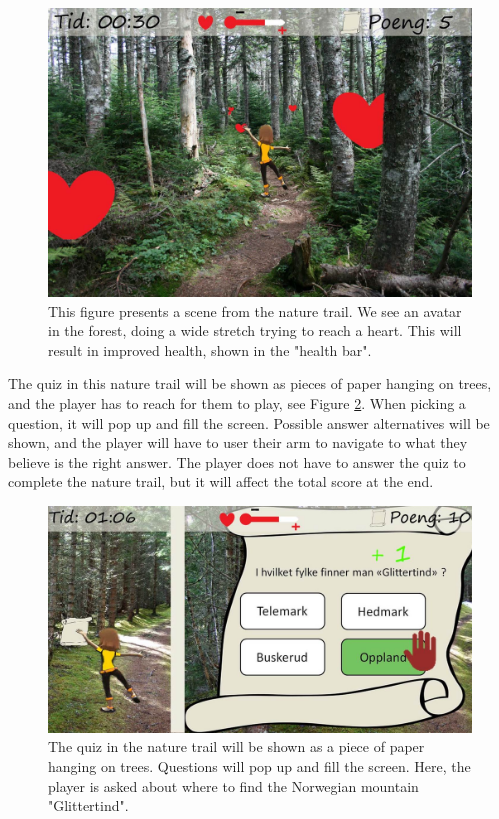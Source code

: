 \begin{figure} [H]
\centering
\includegraphics[scale=0.5]{hjerter.jpg}
\caption[Nature trail - stretching]{This figure presents a scene from the nature trail. We see an avatar in the forest, doing a wide stretch trying to reach a heart. This will result in improved health, shown in the "health bar".}
\label{fig:hearts}
\end{figure}

The quiz in this nature trail will be shown as pieces of paper hanging on trees, and the player has to reach for them to play, see Figure \ref{fig:quiz}. When picking a question, it will pop up and fill the screen. Possible answer alternatives will be shown, and the player will have to user their arm to navigate to what they believe is the right answer. The player does not have to answer the quiz to complete the nature trail, but it will affect the total score at the end. 

\begin{figure} [H]
\centering
\includegraphics[scale=0.5]{quiz.jpg}
\caption[Nature trail - quiz]{The quiz in the nature trail will be shown as a piece of paper hanging on trees. Questions will pop up and fill the screen. Here, the player is asked about where to find the Norwegian mountain "Glittertind".}
\label{fig:quiz}
\end{figure} 

